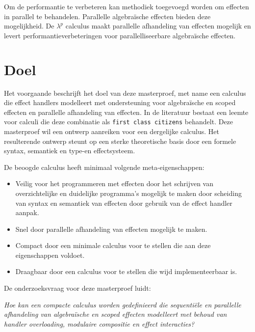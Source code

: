 Om de performantie te verbeteren kan methodiek toegevoegd worden om effecten in parallel te behandelen. Parallelle algebraïsche effecten \cite{Xie2021} bieden deze mogelijkheid. De $\lambda^{p}$ calculus maakt parallelle afhandeling van effecten mogelijk en levert performantieverbeteringen voor parallelliseerbare algebraïsche effecten. \newline

\section{Doel}
Het voorgaande beschrijft het doel van deze masterproef, met name een calculus die effect handlers modelleert met ondersteuning voor algebraïsche en scoped effecten en parallelle afhandeling van effecten. In de literatuur bestaat een leemte voor calculi die deze combinatie als \texttt{first class citizens} behandelt. Deze masterproef wil een ontwerp aanreiken voor een dergelijke calculus. Het resulterende ontwerp steunt op een sterke theoretische basis door een formele syntax, semantiek en type-en effectsysteem. \newline

De beoogde calculus heeft minimaal volgende meta-eigenschappen: 
\begin{itemize}
    \item Veilig voor het programmeren met effecten door het schrijven van overzichtelijke en duidelijke programma's mogelijk te maken door scheiding van syntax en semantiek van effecten door gebruik van de effect handler aanpak.
    \item Snel door parallelle afhandeling van effecten mogelijk te maken.
    \item Compact door een minimale calculus voor te stellen die aan deze eigenschappen voldoet.
    \item Draagbaar door een calculus voor te stellen die wijd implementeerbaar is.
\end{itemize}

 De onderzoeksvraag voor deze masterproef luidt: \newline

\textit{Hoe kan een compacte calculus worden gedefinieerd die sequentiële en parallelle afhandeling van algebraïsche en scoped effecten modelleert met behoud van handler overloading, modulaire compositie en effect interacties?}

